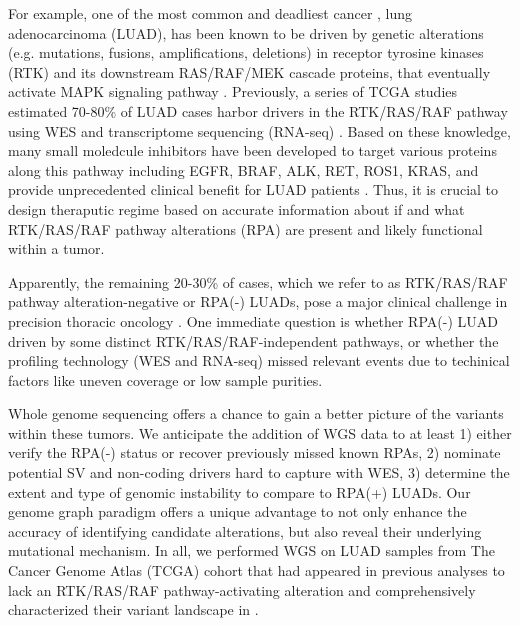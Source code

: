 \documentclass[phd,tocprelim]{cornell}
\begin{document}
For example, one of the most common and deadliest cancer \cite{Siegel2019-gb}, lung adenocarcinoma (LUAD), has been known to be driven by genetic alterations (e.g. mutations, fusions, amplifications, deletions) in receptor tyrosine kinases (RTK) and its downstream RAS/RAF/MEK cascade proteins, that eventually activate MAPK signaling pathway \cite{Desai2014-qe}. Previously, a series of TCGA studies estimated 70-80\% of LUAD cases harbor drivers in the RTK/RAS/RAF pathway using WES and transcriptome sequencing (RNA-seq) \cite{Campbell2016-xv,Cancer_Genome_Atlas_Research_Network2014-ju,Imielinski2012-vv}. Based on these knowledge, many small moledcule inhibitors have been developed to target various proteins along this pathway including EGFR, BRAF, ALK, RET, ROS1, KRAS, and provide unprecedented clinical benefit for LUAD patients \cite{Zhong2021-st}. Thus, it is crucial to design theraputic regime based on accurate information about if and what RTK/RAS/RAF pathway alterations (RPA) are present and likely functional within a tumor.

Apparently, the remaining 20-30\% of cases, which we refer to as RTK/RAS/RAF pathway alteration-negative or RPA(-) LUADs, pose a major clinical challenge in precision thoracic oncology \cite{Campbell2016-xv}. One immediate question is whether RPA(-) LUAD driven by some distinct RTK/RAS/RAF-independent pathways, or whether the profiling technology (WES and RNA-seq) missed relevant events due to techinical factors like uneven coverage or low sample purities. 

Whole genome sequencing offers a chance to gain a better picture of the variants within these tumors. We anticipate the addition of WGS data to at least 1) either verify the RPA(-) status or recover previously missed known RPAs, 2) nominate potential SV and non-coding drivers hard to capture with WES, 3) determine the extent and type of genomic instability to compare to RPA(+) LUADs. Our genome graph paradigm offers a unique advantage to not only enhance the accuracy of identifying candidate alterations, but also reveal their underlying mutational mechanism. In all, we performed WGS on LUAD samples from The Cancer Genome Atlas (TCGA) cohort that had appeared in previous analyses to lack an RTK/RAS/RAF pathway-activating alteration \cite{Campbell2016-xv} and comprehensively characterized their variant landscape in .

\end{document}
